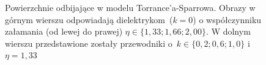 \begin{figure}[H]
\caption[Powierzchnie odbijające w modelu Torrance'a-Sparrowa]{Powierzchnie odbijające w modelu Torrance'a-Sparrowa. Obrazy w górnym wierszu odpowiadają dielektrykom~($k=0$) o współczynniku załamania (od lewej do prawej) $\eta\in\lbrace 1,33; 1,66; 2,00 \rbrace$. W dolnym wierszu przedstawione zostały przewodniki o~$k\in\lbrace 0,2; 0,6; 1,0 \rbrace$ i $\eta = 1,33$}
\label{ch3:img:reflection_types_ts}
\end{figure}
